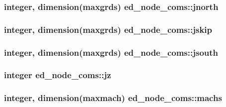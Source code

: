 \subsubsection[{\texorpdfstring{jnorth}{jnorth}}]{\setlength{\rightskip}{0pt plus 5cm}integer, dimension(maxgrds) ed\+\_\+node\+\_\+coms\+::jnorth}\hypertarget{namespaceed__node__coms_afd254e42e760f8e20809b89c6862f940}{}\label{namespaceed__node__coms_afd254e42e760f8e20809b89c6862f940}
\subsubsection[{\texorpdfstring{jskip}{jskip}}]{\setlength{\rightskip}{0pt plus 5cm}integer, dimension(maxgrds) ed\+\_\+node\+\_\+coms\+::jskip}\hypertarget{namespaceed__node__coms_a9427f37c650ec53e118b58d7e64e5aee}{}\label{namespaceed__node__coms_a9427f37c650ec53e118b58d7e64e5aee}
\subsubsection[{\texorpdfstring{jsouth}{jsouth}}]{\setlength{\rightskip}{0pt plus 5cm}integer, dimension(maxgrds) ed\+\_\+node\+\_\+coms\+::jsouth}\hypertarget{namespaceed__node__coms_a1c7e45eb29343f70f7789155ffb43673}{}\label{namespaceed__node__coms_a1c7e45eb29343f70f7789155ffb43673}
\subsubsection[{\texorpdfstring{jz}{jz}}]{\setlength{\rightskip}{0pt plus 5cm}integer ed\+\_\+node\+\_\+coms\+::jz}\hypertarget{namespaceed__node__coms_a58a0ce85c36bbb54b835b48d62281519}{}\label{namespaceed__node__coms_a58a0ce85c36bbb54b835b48d62281519}
\subsubsection[{\texorpdfstring{machs}{machs}}]{\setlength{\rightskip}{0pt plus 5cm}integer, dimension(maxmach) ed\+\_\+node\+\_\+coms\+::machs}\hypertarget{namespaceed__node__coms_ad169e35de47cf7f3b0f522cec093e003}{}\label{namespaceed__node__coms_ad169e35de47cf7f3b0f522cec093e003}
